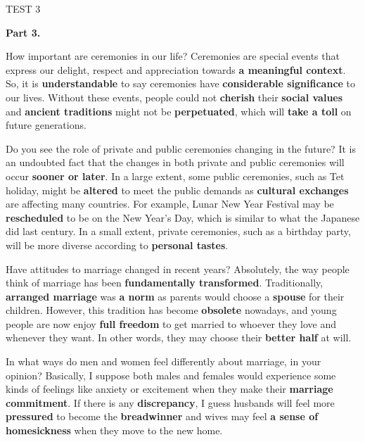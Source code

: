\documentclass[a4paper,12pt]{article}
\begin{document}
\begin{glossarymc}[Cambridge 3]
\begin{test}{TEST 3}
\begin{VocabExplain}[Part 2]
\end{VocabExplain}
\textbf{Part 3.}

\begin{qa}{How important are ceremonies in our life?}
Ceremonies are special events that express our delight, respect and appreciation towards \textbf{a meaningful context}. So, it is \textbf{understandable} to say ceremonies have \textbf{considerable significance} to our lives. Without these events, people could not \textbf{cherish} their \textbf{social values} and \textbf{ancient traditions} might not be \textbf{perpetuated}, which will \textbf{take a toll} on future generations.
\end{qa}

\begin{qa}{Do you see the role of private and public ceremonies changing in the future?}
It is an undoubted fact that the changes in both private and public ceremonies will occur \textbf{sooner or later}. In a large extent, some public ceremonies, such as Tet holiday, might be \textbf{altered} to meet the public demands as \textbf{cultural exchanges} are affecting many countries. For example, Lunar New Year Festival may be \textbf{rescheduled} to be on the New Year's Day, which is similar to what the Japanese did last century. In a small extent, private ceremonies, such as a birthday party, will be more diverse according to \textbf{personal tastes}.
\end{qa}

\begin{qa}{Have attitudes to marriage changed in recent years?}
Absolutely, the way people think of marriage has been \textbf{fundamentally transformed}. Traditionally, \textbf{arranged marriage} was \textbf{a norm} as parents would choose a \textbf{spouse} for their children. However, this tradition has become \textbf{obsolete} nowadays, and young people are now enjoy \textbf{full freedom} to get married to whoever they love and whenever they want. In other words, they may choose their \textbf{better half} at will.
\end{qa}

\begin{qa}{In what ways do men and women feel differently about marriage, in your opinion?}
Basically, I suppose both males and females would experience some kinds of feelings like anxiety or excitement when they make their \textbf{marriage commitment}. If there is any \textbf{discrepancy}, I guess husbands will feel more \textbf{pressured} to become the \textbf{breadwinner} and wives may feel \textbf{a sense of homesickness} when they move to the new home.
\end{qa}


\end{test}
\end{glossarymc}
\end{document}
